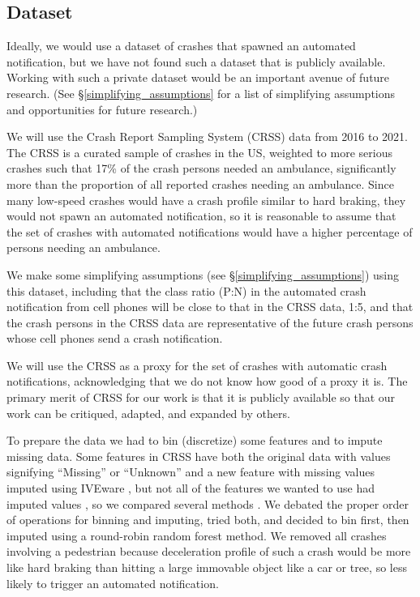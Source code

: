 \subsection{Dataset}
\label{dataset}

Ideally, we would use a dataset of crashes that spawned an automated notification, but we have not found such a dataset that is publicly available.  Working with such a private dataset would be an important avenue of future research. (See \S \ref{simplifying_assumptions} for a list of simplifying assumptions and opportunities for future research.)

We will use the Crash Report Sampling System (CRSS) data from 2016 to 2021.  The CRSS is a curated sample of crashes in the US, weighted to more serious crashes such that 17\% of the crash persons needed an ambulance, significantly more than the proportion of all reported crashes needing an ambulance.  Since many low-speed crashes would have a crash profile similar to hard braking, they would not spawn an automated notification, so it is reasonable to assume that the set of crashes with automated notifications would have a higher percentage of persons needing an ambulance.  

We make some simplifying assumptions (see \S\ref{simplifying_assumptions}) using this dataset, including that the class ratio (P:N) in the automated crash notification from cell phones will be close to that in the CRSS data, 1:5, and that the crash persons in the CRSS data are representative of the future crash persons whose cell phones send a crash notification.  

We will use the CRSS as a proxy for the set of crashes with automatic crash notifications, acknowledging that we do not know how good of a proxy it is. The primary merit of CRSS for our work is that it is publicly available so that our work can be critiqued, adapted, and expanded by others.  

To prepare the data we had to bin (discretize) some features and to impute missing data.  Some features in CRSS have both the original data with values signifying ``Missing'' or ``Unknown'' and a new feature with missing values imputed using IVEware \citep{IVEware}, but not all of the features we wanted to use had imputed values \citep{CRSS_Imputation}, so we compared several methods .  We debated the proper order of operations for binning and imputing, tried both, and decided to bin first, then imputed using a round-robin random forest method.  We removed all crashes involving a pedestrian because deceleration profile of such a crash would be more like hard braking than hitting a large immovable object like a car or tree, so less likely to trigger an automated notification.  

